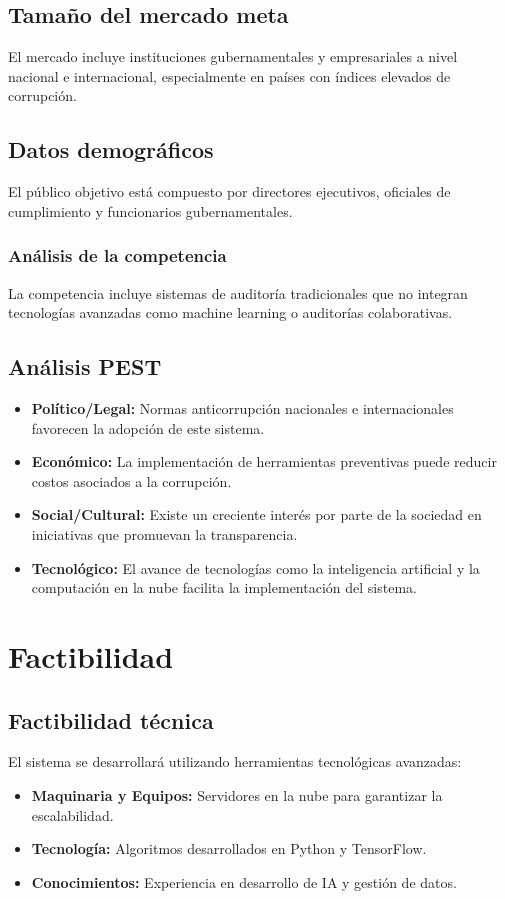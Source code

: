 \documentclass[a4paper,12pt]{article}
\begin{document}
\subsection{Tamaño del mercado meta}
El mercado incluye instituciones gubernamentales y empresariales a nivel nacional e internacional, especialmente en países con índices elevados de corrupción.

\subsection{Datos demográficos}
El público objetivo está compuesto por directores ejecutivos, oficiales de cumplimiento y funcionarios gubernamentales.

\subsubsection{Análisis de la competencia}
La competencia incluye sistemas de auditoría tradicionales que no integran tecnologías avanzadas como machine learning o auditorías colaborativas.

\subsection{Análisis PEST}
\begin{itemize}
    \item \textbf{Político/Legal:} Normas anticorrupción nacionales e internacionales favorecen la adopción de este sistema.
    \item \textbf{Económico:} La implementación de herramientas preventivas puede reducir costos asociados a la corrupción.
    \item \textbf{Social/Cultural:} Existe un creciente interés por parte de la sociedad en iniciativas que promuevan la transparencia.
    \item \textbf{Tecnológico:} El avance de tecnologías como la inteligencia artificial y la computación en la nube facilita la implementación del sistema.
\end{itemize}

\section{Factibilidad}
\subsection{Factibilidad técnica}
El sistema se desarrollará utilizando herramientas tecnológicas avanzadas:
\begin{itemize}
    \item \textbf{Maquinaria y Equipos:} Servidores en la nube para garantizar la escalabilidad.
    \item \textbf{Tecnología:} Algoritmos desarrollados en Python y TensorFlow.
    \item \textbf{Conocimientos:} Experiencia en desarrollo de IA y gestión de datos.
\end{itemize}
\end{document}

